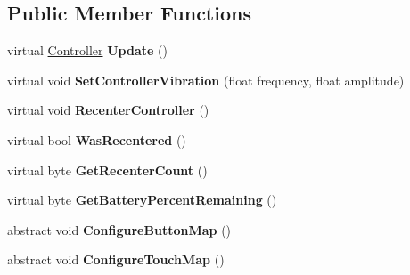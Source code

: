 \subsection*{Public Member Functions}
\begin{DoxyCompactItemize}
\item 
\mbox{\label{class_o_v_r_input_1_1_o_v_r_controller_base_a56a2e0f10d70f2809115af96dc14e545}} 
virtual \mbox{\hyperlink{class_o_v_r_input_a5c86f9052a9cbb0b73779ff5704d60a8}{Controller}} {\bfseries Update} ()
\item 
\mbox{\label{class_o_v_r_input_1_1_o_v_r_controller_base_af02378b77fb16663ec5a017afc657ad0}} 
virtual void {\bfseries Set\+Controller\+Vibration} (float frequency, float amplitude)
\item 
\mbox{\label{class_o_v_r_input_1_1_o_v_r_controller_base_ad9f83ee875a3b0a16a18ad31bed75fc3}} 
virtual void {\bfseries Recenter\+Controller} ()
\item 
\mbox{\label{class_o_v_r_input_1_1_o_v_r_controller_base_ad8a8c2a17c486936f6c3a9ff5ae01bda}} 
virtual bool {\bfseries Was\+Recentered} ()
\item 
\mbox{\label{class_o_v_r_input_1_1_o_v_r_controller_base_ac954189a1c263c4172197c40d49bfae0}} 
virtual byte {\bfseries Get\+Recenter\+Count} ()
\item 
\mbox{\label{class_o_v_r_input_1_1_o_v_r_controller_base_a57d8e8008f1478c61aacf5d917c81254}} 
virtual byte {\bfseries Get\+Battery\+Percent\+Remaining} ()
\item 
\mbox{\label{class_o_v_r_input_1_1_o_v_r_controller_base_a9b4b0218ba0154aa1ffb886d229b0797}} 
abstract void {\bfseries Configure\+Button\+Map} ()
\item 
\mbox{\label{class_o_v_r_input_1_1_o_v_r_controller_base_a612c5bfd20746bbc5fd976933f9a2fd0}} 
abstract void {\bfseries Configure\+Touch\+Map} ()

\end{DoxyCompactItemize}
